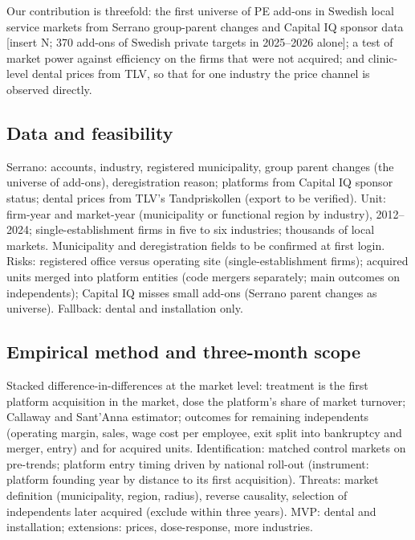 \documentclass[12pt,a4paper]{article}
\begin{document}
Our contribution is threefold: the first universe of PE add-ons in Swedish local service markets from Serrano group-parent changes and Capital IQ sponsor data [insert N; 370 add-ons of Swedish private targets in 2025--2026 alone]; a test of market power against efficiency on the firms that were not acquired; and clinic-level dental prices from TLV, so that for one industry the price channel is observed directly.

\subsection{Data and feasibility}

Serrano: accounts, industry, registered municipality, group parent changes (the universe of add-ons), deregistration reason; platforms from Capital IQ sponsor status; dental prices from TLV's Tandpriskollen (export to be verified). Unit: firm-year and market-year (municipality or functional region by industry), 2012--2024; single-establishment firms in five to six industries; thousands of local markets. Municipality and deregistration fields to be confirmed at first login. Risks: registered office versus operating site (single-establishment firms); acquired units merged into platform entities (code mergers separately; main outcomes on independents); Capital IQ misses small add-ons (Serrano parent changes as universe). Fallback: dental and installation only.

\subsection{Empirical method and three-month scope}

Stacked difference-in-differences at the market level: treatment is the first platform acquisition in the market, dose the platform's share of market turnover; Callaway and Sant'Anna estimator; outcomes for remaining independents (operating margin, sales, wage cost per employee, exit split into bankruptcy and merger, entry) and for acquired units. Identification: matched control markets on pre-trends; platform entry timing driven by national roll-out (instrument: platform founding year by distance to its first acquisition). Threats: market definition (municipality, region, radius), reverse causality, selection of independents later acquired (exclude within three years). MVP: dental and installation; extensions: prices, dose-response, more industries.
\end{document}
